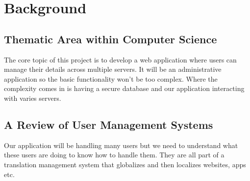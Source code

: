 \chapter{Background}
\label{chap:background}

\section{Thematic Area within Computer Science}
The core topic of this project is to develop a web application where users can manage their details across multiple servers. It will be an administrative application so the basic functionality won't be too complex. Where the complexity comes in is having a secure database and our application interacting with varies servers. 



\section{A Review of User Management Systems}
Our application will be handling many users but we need to understand what these users are doing to know how to handle them. They are all part of a translation management system that globalizes and then localizes websites, apps etc. 


